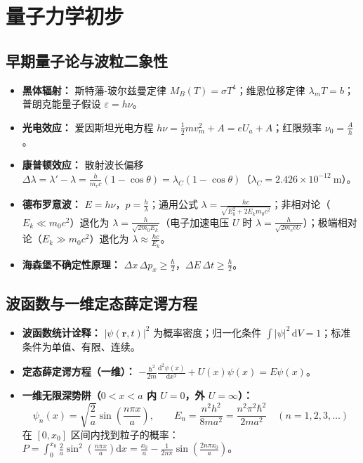 \documentclass[zihao=5,a4paper,UTF8]{ctexart}
\newcommand{\dd}{\mathrm{d}}
\newcommand{\vect}[1]{\bm{#1}}
\newcommand{\eps}{\varepsilon}
\begin{document}
\section{量子力学初步}

\subsection{早期量子论与波粒二象性}

\begin{formulabox}[早期量子论核心公式]
\begin{itemize}
    \item \textbf{黑体辐射：} 斯特藩-玻尔兹曼定律 $M_B(T) = \sigma T^4$；维恩位移定律 $\lambda_m T = b$；普朗克能量子假设 $\eps = h\nu$。
    \item \textbf{光电效应：} 爱因斯坦光电方程 $h\nu = \frac{1}{2}mv_m^2 + A = eU_a + A$；红限频率 $\nu_0 = \frac{A}{h}$。
    \item \textbf{康普顿效应：} 散射波长偏移 $\Delta\lambda = \lambda' - \lambda = \frac{h}{m_e c}(1 - \cos\theta) = \lambda_C(1 - \cos\theta)$（$\lambda_C = 2.426\times 10^{-12}\ \mathrm{m}$）。
    \item \textbf{德布罗意波：} $E = h\nu$，$p = \frac{h}{\lambda}$；通用公式 $\lambda = \frac{hc}{\sqrt{E_k^2 + 2E_k m_0 c^2}}$；非相对论（$E_k \ll m_0 c^2$）退化为 $\lambda = \frac{h}{\sqrt{2m_0 E_k}}$（电子加速电压 $U$ 时 $\lambda = \frac{h}{\sqrt{2m_e e U}}$）；极端相对论（$E_k \gg m_0 c^2$）退化为 $\lambda \approx \frac{hc}{E_k}$。
    \item \textbf{海森堡不确定性原理：} $\Delta x\,\Delta p_x \ge \frac{\hbar}{2}$，$\Delta E\,\Delta t \ge \frac{\hbar}{2}$。
\end{itemize}
\end{formulabox}

\subsection{波函数与一维定态薛定谔方程}

\begin{formulabox}[波函数与一维无限深势阱核心公式]
\begin{itemize}
    \item \textbf{波函数统计诠释：} $|\psi(\vect{r},t)|^2$ 为概率密度；归一化条件 $\int |\psi|^2\,\dd V = 1$；标准条件为单值、有限、连续。
    \item \textbf{定态薛定谔方程（一维）：} $-\frac{\hbar^2}{2m}\frac{\dd^2\psi(x)}{\dd x^2} + U(x)\psi(x) = E\psi(x)$。
    \item \textbf{一维无限深势阱（$0 < x < a$ 内 $U=0$，外 $U=\infty$）：}
    \[
        \psi_n(x) = \sqrt{\frac{2}{a}}\sin\left(\frac{n\pi x}{a}\right), \qquad E_n = \frac{n^2 h^2}{8ma^2} = \frac{n^2\pi^2\hbar^2}{2ma^2}\quad (n=1,2,3,\dots)
    \]
    在 $[0, x_0]$ 区间内找到粒子的概率：$P = \int_0^{x_0} \frac{2}{a}\sin^2\left(\frac{n\pi x}{a}\right)\dd x = \frac{x_0}{a} - \frac{1}{2n\pi}\sin\left(\frac{2n\pi x_0}{a}\right)$。
\end{itemize}
\end{formulabox}
\end{document}
